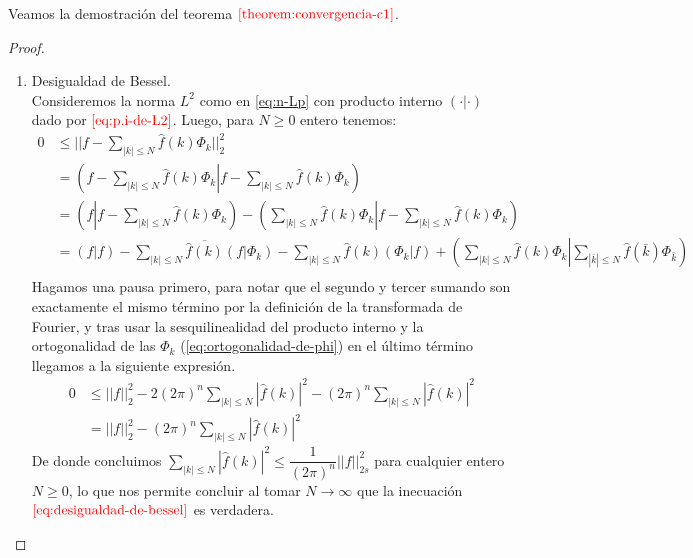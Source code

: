     Veamos la demostración del teorema $\textcolor{red}{\ref{theorem:convergencia-c1}}$.
    \begin{proof}
    \begin{enumerate}
      \item Desigualdad de Bessel.\\
        Consideremos la norma $L^2$ como en \textcolor{red}{\ref{eq:n-Lp}} con producto interno $(\cdot|\cdot)$ dado por $\textcolor{red}{\ref{eq:p.i-de-L2}}$. Luego, para $N\geq 0$ entero tenemos:
        \begin{align*}
          0 & \leq ||f - \sum_{|k| \leq N} \widehat{f}(k) \Phi _{k} ||^{2}_{2}\\ 
          &= \left( f - \sum_{|k| \leq N} \widehat{f}(k) \Phi _{k} \left| f - \sum_{|k| \leq N} \widehat{f}(k) \Phi _{k} \right. \right)\\ 
          &= \left( f  \left| f - \sum_{|k| \leq N} \widehat{f}(k) \Phi _{k} \right. \right) - \left(\sum_{|k| \leq N} \widehat{f}(k) \Phi _{k} \left| f - \sum_{|k| \leq N} \widehat{f}(k) \Phi _{k} \right. \right)\\ 
          &= \left( f  \left| f \right. \right) - \sum_{|k| \leq N} \overline{\widehat{f}(k)} \left( f  \left| \Phi _{k} \right. \right) - \sum_{|k| \leq N} \widehat{f}(k) \left( \Phi _{k} \left| f \right. \right) + \left(\sum_{|k| \leq N} \widehat{f}(k) \Phi _{k} \left| \sum_{|\bar{k}| \leq N} \widehat{f}(\bar{k}) \Phi _{\bar{k}} \right. \right)\\
        \end{align*}
        Hagamos una pausa primero, para notar que el segundo y tercer sumando son exactamente el mismo término por la definición de la transformada de Fourier, y tras usar la sesquilinealidad del producto interno y la ortogonalidad de las $\Phi _{k}$ (\textcolor{red}{\ref{eq:ortogonalidad-de-phi}}) en el último término llegamos a la siguiente expresión.
        \begin{align*}
          0 & \leq ||f||^{2}_{2} - 2 (2\pi)^{n} \sum_{|k| \leq N }|\widehat{f}(k)|^{2} - (2\pi)^{n} \sum_{|k| \leq N}|\widehat{f}(k)|^{2}\\ 
          &= ||f||^{2}_{2} - (2 \pi)^{n} \sum_{|k|\leq N}|\widehat{f}(k)|^{2} 
        \end{align*}
        De donde concluimos $\displaystyle \sum_{|k|\leq N}|\widehat{f}(k)|^{2} \leq \dfrac{1}{(2\pi)^{n}}||f||^{2}_{2s}$ para cualquier entero $N \geq 0$, lo que nos permite concluir al tomar $N\rightarrow \infty$ que la inecuación $\textcolor{red}{\ref{eq:desigualdad-de-bessel}}$ es verdadera.

\end{enumerate}
\end{proof}
